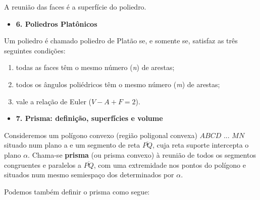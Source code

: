 A reunião das faces é a superfície do poliedro.



\begin{itemize}
    \item \textbf{6. Poliedros Platônicos}
\end{itemize}

Um poliedro é chamado poliedro de Platão se, e somente se, satisfaz as três seguintes condições:

\begin{enumerate}
    \item todas as faces têm o mesmo número (\textit{n}) de arestas;
    \item todos os ângulos poliédricos têm o mesmo número (\textit{m}) de arestas;
    \item vale a relação de Euler ($V - A + F = 2$).
\end{enumerate}



\begin{itemize}
    \item \textbf{7. Prisma: definição, superfícies e volume} %
\end{itemize}

Consideremos um polígono convexo (região poligonal convexa) $ABCD$ ... $MN$ situado num plano a e um segmento de reta $\overline{PQ}$, cuja reta suporte intercepta o plano $\alpha$. Chama-se \textbf{prisma} (ou prisma convexo) à reunião de todos os segmentos congruentes e paralelos a $\overline{PQ}$, com uma extremidade nos pontos do polígono e situados num mesmo semiespaço dos determinados por $\alpha$.

Podemos também definir o prisma como segue:

